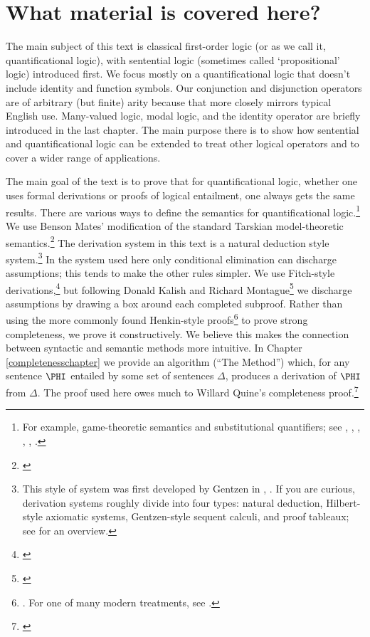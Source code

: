 \documentclass[11pt,fleqn,twoside,openright]{report}%
\newcommand{\mention}[1]{`#1'}
\begin{document}
\section*{What material is covered here?}
The main subject of this text is classical first-order logic (or as we call it, quantificational logic), with sentential logic (sometimes called \mention{propositional} logic) introduced first. 
We focus mostly on a quantificational logic that doesn't include identity and function symbols.  
Our conjunction and disjunction operators are of arbitrary (but finite) arity because that more closely mirrors typical English use.  
Many-valued logic, modal logic, and the identity operator are briefly introduced in the last chapter.  The main purpose there is to show how sentential and quantificational logic can be extended to treat other logical operators and to cover a wider range of applications. 

The main goal of the text is to prove that for quantificational logic, whether one uses formal derivations or proofs of logical entailment, one always gets the same results. 
There are various ways to define the semantics for quantificational logic.\footnote{For example, game-theoretic semantics and substitutional quantifiers; see \citealp{Dunn1968}, \citealp{Stevenson1973}, \citealp{Hintikka1996}, \citealp{Leblanc2001}, \citealp{Westerstahl2001}, \citealp{Jacquette2002}.}  We use Benson Mates' modification of the standard Tarskian model-theoretic semantics.\footnote{\citealp{Mates1972}} 
The derivation system in this text is a natural deduction style system.\footnote{This style of system was first developed by Gentzen in \citeyearpar{Gentzen1934}, \citealt[26]{Hodges2001}. If you are curious, derivation systems roughly divide into four types: natural deduction, Hilbert-style axiomatic systems, Gentzen-style sequent calculi, and proof tableaux; see \citealt[24]{Hodges2001b} for an overview.} 
In the system used here only conditional elimination can discharge assumptions; this tends to make the other rules simpler. 
We use Fitch-style derivations,\footnote{\citealt{Fitch1952}} but following Donald Kalish and Richard Montague\footnote{\citealp{Kalish1964}} we discharge assumptions by drawing a box around each completed subproof.
Rather than using the more commonly found Henkin-style proofs\footnote{\citealt{Henkin1949}. For one of many modern treatments, see \citealp[ch.~11.4]{Bergmann2003}.} to prove strong completeness, we prove it constructively. We believe this makes the connection between syntactic and semantic methods more intuitive.  In Chapter \ref{completenesschapter} we provide an algorithm (``The Method'') which, for any sentence $\PHI$ entailed by some set of sentences $\Delta$, produces a derivation of $\PHI$ from $\Delta$. 
The proof used here owes much to Willard Quine's completeness proof.\footnote{\citealp{Quine1982}}
\end{document}
